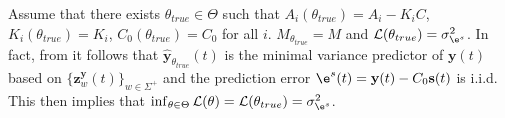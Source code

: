 \documentclass{ifacconf}
\def\rve{{\mathbf{e}}}
\def\rvs{{\mathbf{s}}}
\def\rvy{{\mathbf{y}}}
\def\rvz{{\mathbf{z}}}
\begin{document}
Assume that there exists $\theta_{true} \in \Theta$ such that 
$A_{i}(\theta_{true}) = A_i-K_iC$, $K_{i}(\theta_{true}) = K_i$, $C_{0}(\theta_{true}) = C_0$ for all $i$.
$M_{\theta_{true}}=M$ and $\mathcal{L}(\theta_{true})=\sigma^2_{\e^s}$. 
In fact, from \cite{ElieCDC2022} it follows that $\hat{\rvy}_{\theta_{true}}(t)$ 
 is the minimal variance predictor of $\rvy(t)$ based on 
$\{\rvz_{w}^{\rvy}(t)\}_{w \in \Sigma^{+}}$ and 
the prediction error $\e^s(t)=\rvy(t)-C_0\rvs(t)$ is i.i.d.
%
This then implies that $\inf_{\theta \in \Theta} \mathcal{L}(\theta)=\mathcal{L}(\theta_{true})=\sigma^2_{\e^s}$.
\end{document}
